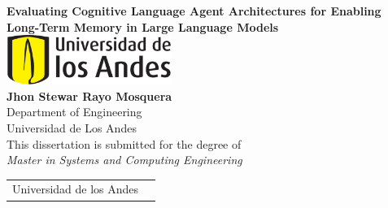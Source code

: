 \centering
\vspace*{0.5in}

{\huge \textbf{Evaluating Cognitive Language Agent Architectures for Enabling Long-Term Memory in Large Language Models}}\\[2.0cm]

\includegraphics[width=0.4\textwidth]{images/uniandes.pdf}\\[2.0cm]

{\Large \textbf{Jhon Stewar Rayo Mosquera}}\\[1.0cm]
{Department of Engineering}\\[0.1cm]
{Universidad de Los Andes}\\[2.0cm]

{This dissertation is submitted for the degree of}\\
{\emph{Master in Systems and Computing Engineering}}

\vfill

\begin{tabular}{@{}p{}@{}p{}@{}}
    \raggedright {Universidad de los Andes} & \raggedleft {January 2025}
\end{tabular}